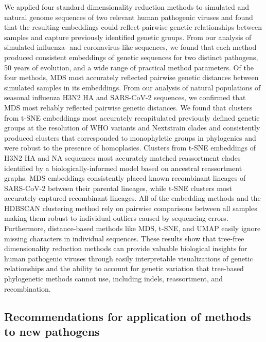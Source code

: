 \documentclass[webpdf,contemporary,large,single]{oup-authoring-template}%
\theoremstyle{thmstyleone}%
\theoremstyle{thmstyletwo}%
\theoremstyle{thmstylethree}%
\begin{document}
We applied four standard dimensionality reduction methods to simulated and natural genome sequences of two relevant human pathogenic viruses and found that the resulting embeddings could reflect pairwise genetic relationships between samples and capture previously identified genetic groups.
From our analysis of simulated influenza- and coronavirus-like sequences, we found that each method produced consistent embeddings of genetic sequences for two distinct pathogens, 50 years of evolution, and a wide range of practical method parameters.
Of the four methods, MDS most accurately reflected pairwise genetic distances between simulated samples in its embeddings.
From our analysis of natural populations of seasonal influenza H3N2 HA and SARS-CoV-2 sequences, we confirmed that MDS most reliably reflected pairwise genetic distances.
We found that clusters from t-SNE embeddings most accurately recapitulated previously defined genetic groups at the resolution of WHO variants and Nextstrain clades and consistently produced clusters that corresponded to monophyletic groups in phylogenies and were robust to the presence of homoplasies.
Clusters from t-SNE embeddings of H3N2 HA and NA sequences most accurately matched reassortment clades identified by a biologically-informed model based on ancestral reassortment graphs.
MDS embeddings consistently placed known recombinant lineages of SARS-CoV-2 between their parental lineages, while t-SNE clusters most accurately captured recombinant lineages.
All of the embedding methods and the HDBSCAN clustering method rely on pairwise comparisons between all samples making them robust to individual outliers caused by sequencing errors.
Furthermore, distance-based methods like MDS, t-SNE, and UMAP easily ignore missing characters in individual sequences.
These results show that tree-free dimensionality reduction methods can provide valuable biological insights for human pathogenic viruses through easily interpretable visualizations of genetic relationships and the ability to account for genetic variation that tree-based phylogenetic methods cannot use, including indels, reassortment, and recombination.

\subsection{Recommendations for application of methods to new pathogens}
\end{document}
